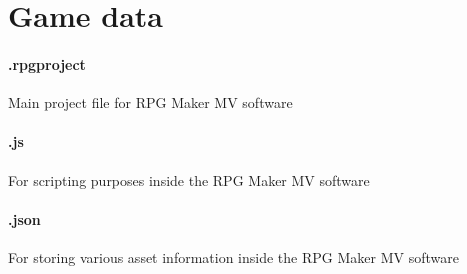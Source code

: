 \section{Game data}
\paragraph{.rpgproject}
		 Main project file for RPG Maker MV software 

\paragraph{.js}
	 For scripting purposes inside the RPG Maker MV software

\paragraph{.json}
	 For storing various asset information inside the RPG Maker MV software













\pagebreak